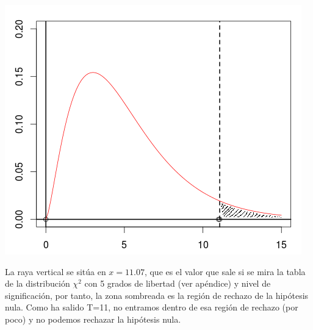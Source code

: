 \documentclass[palatino,nochap]{apuntes}
\begin{document}
\begin{example}
\begin{enumerate}
\includegraphics[scale=0.75]{img/ejemploEstadistica.png}

La raya vertical se sitúa en $x=11.07$, que es el valor que sale si se mira la tabla de la distribución $\chi^2$ con 5 grados de libertad (ver apéndice) y nivel de significación, por tanto, la zona sombreada es la región de rechazo de la hipótesis nula. Como ha salido T=11, no entramos dentro de esa región de rechazo (por poco) y no podemos rechazar la hipótesis nula.

\end{enumerate}
\end{example}
\end{document}
